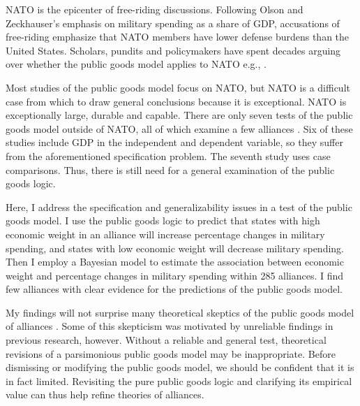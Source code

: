 \documentclass[12pt]{article}
\begin{document}
NATO is the epicenter of free-riding discussions. 
Following Olson and Zeckhauser's emphasis on military spending as a share of GDP, accusations of free-riding emphasize that NATO members have lower defense burdens than the United States. 
Scholars, pundits and policymakers have spent decades arguing over whether the public goods model applies to NATO e.g., \citep{SandlerForbes1980, Palmer1990, Boyer1993, GatesTerasawa1992, SandlerHartley2001, Lanoszka2015, PluemperNeumayer2015}.


Most studies of the public goods model focus on NATO, but NATO is a difficult case from which to draw general conclusions because it is exceptional. 
NATO is exceptionally large, durable and capable. 
There are only seven tests of the public goods model outside of NATO, all of which examine a few alliances \citep{Russett1970, Starr1974, Reisinger1983, Thies1987, ConybeareSandler1990, OnealWhatley1996, Siroky2012}. 
Six of these studies include GDP in the independent and dependent variable, so they suffer from the aforementioned specification problem.
The seventh study uses case comparisons.
Thus, there is still need for a general examination of the public goods logic. 


Here, I address the specification and generalizability issues in a test of the public goods model.  
I use the public goods logic to predict that states with high economic weight in an alliance will increase percentage changes in military spending, and states with low economic weight will decrease military spending.
Then I employ a Bayesian model to estimate the association between economic weight and percentage changes in military spending within 285 alliances. 
I find few alliances with clear evidence for the predictions of the public goods model. 


My findings will not surprise many theoretical skeptics of the public goods model of alliances \citep{Palmer1990, GatesTerasawa1992, SandlerHartley2001, Norrlof2010, NiouZeigler2019}.
Some of this skepticism was motivated by unreliable findings in previous research, however. 
Without a reliable and general test, theoretical revisions of a parsimonious public goods model may be inappropriate.
Before dismissing or modifying the public goods model, we should be confident that it is in fact limited.
Revisiting the pure public goods logic and clarifying its empirical value can thus help refine theories of alliances. 
\end{document}
